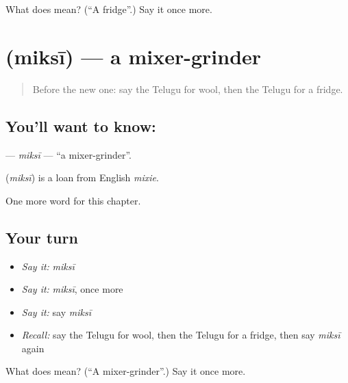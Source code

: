 \begin{tcolorbox}[breakable,colback=teal!4,colframe=teal!35!black,title={Before you move on}]
What does  mean? (\textquotedblleft{}A fridge\textquotedblright{}.) Say it once more.
\end{tcolorbox}
\section[\texorpdfstring{\te{మిక్సీ} (miksī)}{మిక్సీ (miksī)}]{ (miksī) — a mixer-grinder}

\label{lesson:TE-C307-miksi}



\begin{quote}
Before the new one: say the Telugu for wool, then the Telugu for a fridge.
\end{quote}

\subsection*{You'll want to know: }
\textbf{} — \emph{miksī} — \textquotedblleft{}a mixer-grinder\textquotedblright{}.

\begin{cousinweb}
\textbf{} (\emph{miksī}) is a loan from English \emph{mixie}.
\end{cousinweb}

\begin{grammarlens}[title={What you've built}]
One more word for this chapter.
\end{grammarlens}

\subsection*{Your turn}
\begin{itemize}
\raggedright
  \item \emph{Say it:} \emph{miksī}
  \item \emph{Say it:} \emph{miksī}, once more
  \item \emph{Say it:} say \emph{miksī}
  \item \emph{Recall:} say the Telugu for wool, then the Telugu for a fridge, then say \emph{miksī} again
\end{itemize}

\begin{tcolorbox}[breakable,colback=teal!4,colframe=teal!35!black,title={Before you move on}]
What does  mean? (\textquotedblleft{}A mixer-grinder\textquotedblright{}.) Say it once more.
\end{tcolorbox}
